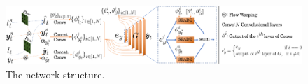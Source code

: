 \documentclass[runningheads]{llncs}
\def\mathbi#1{\textbf{\em #1}}
\begin{document}

\begin{figure}[t]
\includegraphics[width= \linewidth]{latex/images/3dgan.png}
\centering
\caption{The network structure.}
\label{fig:composite}
\end{figure}
\end{document}
